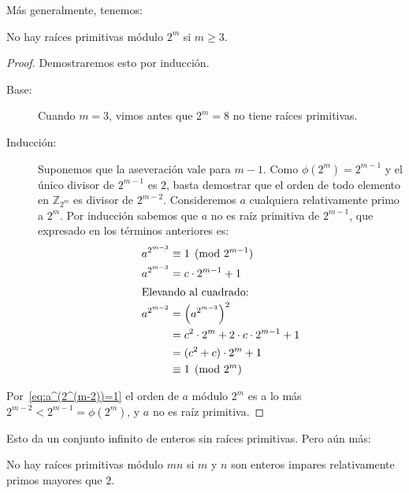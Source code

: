   Más generalmente,
  tenemos:
  \begin{theorem}
    \label{theo:raices-primitivas-2k}
    No hay raíces primitivas módulo \(2^m\) si \(m \ge 3\).
  \end{theorem}
  \begin{proof}
    Demostraremos esto por inducción.%
    \begin{description}
    \item[Base:]
      Cuando \(m = 3\),
      vimos antes que \(2^m = 8\) no tiene raíces primitivas.
    \item[Inducción:]
      Suponemos que la aseveración vale para \(m - 1\).
      Como \mbox{\(\phi(2^m) = 2^{m - 1}\)}
      y el único divisor de \(2^{m - 1}\) es \(2\),
      basta demostrar
      que el orden de todo elemento en \(\mathbb{Z}_{2^m}\)
      es divisor de \(2^{m - 2}\).
      Consideremos \(a\) cualquiera relativamente primo a \(2^m\).
      Por inducción
      sabemos que \(a\) no es raíz primitiva de \(2^{m - 1}\),
      que expresado en los términos anteriores es:
      \begin{align}
	a^{2^{m - 3}}
	  &\equiv 1 \pmod{2^{m - 1}} \notag \\
	a^{2^{m - 3}}
	  &= c \cdot 2^{m - 1} + 1   \notag \\
      \intertext{Elevando al cuadrado:}
	a^{2^{m - 2}}
	  &= \left(a^{2^{m - 3}}\right)^2 \notag \\
	  &= c^2 \cdot 2^m + 2 \cdot c \cdot 2^{m - 1} + 1 \notag \\
	  &= (c^2 + c) \cdot 2^m + 1 \notag \\
	  &\equiv 1 \pmod{2^m} \label{eq:a^(2^(m-2))=1}
      \end{align}
    \end{description}
    Por~\eqref{eq:a^(2^(m-2))=1}
    el orden de \(a\) módulo \(2^m\)
    es a lo más \(2^{m - 2} < 2^{m - 1} = \phi(2^m)\),
    y \(a\) no es raíz primitiva.
  \end{proof}
  Esto da un conjunto infinito de enteros sin raíces primitivas.
  Pero aún más:
  \begin{theorem}
    \label{theo:raices-primitivas-mn}
    No hay raíces primitivas módulo \(m n\)
    si \(m\) y \(n\) son enteros impares relativamente primos
    mayores que \(2\).
  \end{theorem}
